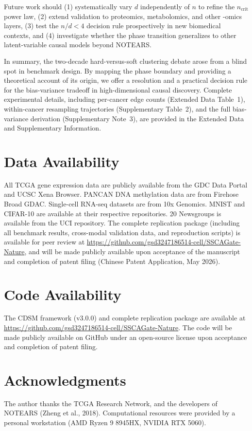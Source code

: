 \documentclass[12pt,a4paper]{article}
\begin{document}
Future work should (1) systematically vary $d$ independently of $n$ to refine the $n_{\text{crit}}$ power law, (2) extend validation to proteomics, metabolomics, and other -omics layers, (3) test the $n/d < 4$ decision rule prospectively in new biomedical contexts, and (4) investigate whether the phase transition generalizes to other latent-variable causal models beyond NOTEARS.

In summary, the two-decade hard-versus-soft clustering debate arose from a blind spot in benchmark design. By mapping the phase boundary and providing a theoretical account of its origin, we offer a resolution and a practical decision rule for the bias-variance tradeoff in high-dimensional causal discovery. Complete experimental details, including per-cancer edge counts (Extended Data Table~1), within-cancer resampling trajectories (Supplementary Table~2), and the full bias-variance derivation (Supplementary Note~3), are provided in the Extended Data and Supplementary Information.

\section*{Data Availability}
All TCGA gene expression data are publicly available from the GDC Data Portal and UCSC Xena Browser. PANCAN DNA methylation data are from Firehose Broad GDAC. Single-cell RNA-seq datasets are from 10x Genomics. MNIST and CIFAR-10 are available at their respective repositories. 20 Newsgroups is available from the UCI repository. The complete replication package (including all benchmark results, cross-modal validation data, and reproduction scripts) is available for peer review at \url{https://github.com/gsd3247186514-cell/SSCAGate-Nature}, and will be made publicly available upon acceptance of the manuscript and completion of patent filing (Chinese Patent Application, May 2026).

\section*{Code Availability}
The CDSM framework (v3.0.0) and complete replication package are available at \url{https://github.com/gsd3247186514-cell/SSCAGate-Nature}. The code will be made publicly available on GitHub under an open-source license upon acceptance and completion of patent filing.

\section*{Acknowledgments}
The author thanks the TCGA Research Network, and the developers of NOTEARS (Zheng et al., 2018). Computational resources were provided by a personal workstation (AMD Ryzen 9 8945HX, NVIDIA RTX 5060).
\end{document}
